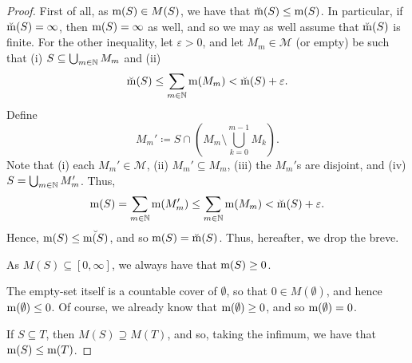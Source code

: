 \begin{thm}
\begin{savenotes}
\begin{proof}
First of all, as $\mathrm{m} (S)\in M(S)$, we have that $\breve{\mathrm{m}}(S)\leq \mathrm{m} (S)$.  In particular, if $\breve{\mathrm{m}}(S)=\infty$, then $\mathrm{m} (S)=\infty$ as well, and so we may as well assume that $\breve{\mathrm{m}}(S)$ is finite.  For the other inequality, let $\varepsilon >0$, and let $M_m\in \mathcal{M}$ (or empty) be such that (i) $S\subseteq \bigcup _{m\in \mathbb{N}}M_m$ and (ii)
\begin{equation}
\breve{\mathrm{m}}(S)\leq \sum _{m\in \mathbb{N}}\mathrm{m} (M_m)<\breve{\mathrm{m}}(S)+\varepsilon .
\end{equation}
Define
\begin{equation}
M_m'\coloneqq S\cap \left( M_m\setminus \bigcup _{k=0}^{m-1}M_k\right) .
\end{equation}
Note that (i) each $M_m'\in \mathcal{M}$, (ii) $M_m'\subseteq M_m$, (iii) the $M_m'$s are disjoint, and (iv) $S=\bigcup _{m\in \mathbb{N}}M_m'$.  Thus,
\begin{equation}
\mathrm{m} (S)=\sum _{m\in \mathbb{N}}\mathrm{m} (M_m')\leq \sum _{m\in \mathbb{N}}\mathrm{m} (M_m)<\breve{\mathrm{m}}(S)+\varepsilon .
\end{equation}
Hence, $\mathrm{m} (S)\leq \breve{\mathrm{m} (S)}$, and so $\mathrm{m} (S)=\breve{\mathrm{m}}(S)$.  Thus, hereafter, we drop the breve.

As $M(S)\subseteq [0,\infty ]$, we always have that $\mathrm{m} (S)\geq 0$.

The empty-set itself is a countable cover of $\emptyset$, so that $0\in M(\emptyset )$, and hence $\mathrm{m} (\emptyset )\leq 0$.  Of course, we already know that $\mathrm{m} (\emptyset )\geq 0$, and so $\mathrm{m} (\emptyset )=0$.

If $S\subseteq T$, then $M(S)\supseteq M(T)$, and so, taking the infimum, we have that $\mathrm{m} (S)\leq \mathrm{m} (T)$.


\end{proof}
\end{savenotes}
\end{thm}
